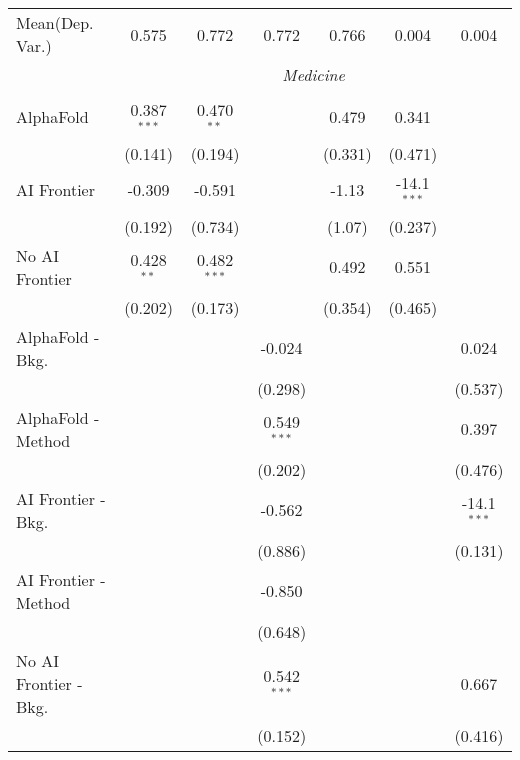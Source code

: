 \begin{tabular}{lcccccc}
Mean(Dep. Var.) & 0.575 & 0.772 & 0.772 & 0.766 & 0.004 & 0.004 \\
 & \multicolumn{6}{c}{\textit{Medicine}} \\ \\
   AlphaFold               & 0.387$^{***}$ & 0.470$^{**}$  &               & 0.479   & 0.341         &   \\   
                           & (0.141)       & (0.194)       &               & (0.331) & (0.471)       &   \\   
   AI Frontier             & -0.309        & -0.591        &               & -1.13   & -14.1$^{***}$ &   \\   
                           & (0.192)       & (0.734)       &               & (1.07)  & (0.237)       &   \\   
   No AI Frontier          & 0.428$^{**}$  & 0.482$^{***}$ &               & 0.492   & 0.551         &   \\   
                           & (0.202)       & (0.173)       &               & (0.354) & (0.465)       &   \\   
   AlphaFold - Bkg.        &               &               & -0.024        &         &               & 0.024\\   
                           &               &               & (0.298)       &         &               & (0.537)\\   
   AlphaFold - Method      &               &               & 0.549$^{***}$ &         &               & 0.397\\   
                           &               &               & (0.202)       &         &               & (0.476)\\   
   AI Frontier - Bkg.      &               &               & -0.562        &         &               & -14.1$^{***}$\\   
                           &               &               & (0.886)       &         &               & (0.131)\\   
   AI Frontier - Method    &               &               & -0.850        &         &               &   \\   
                           &               &               & (0.648)       &         &               &   \\   
   No AI Frontier - Bkg.   &               &               & 0.542$^{***}$ &         &               & 0.667\\   
                           &               &               & (0.152)       &         &               & (0.416)\\   

\end{tabular}
